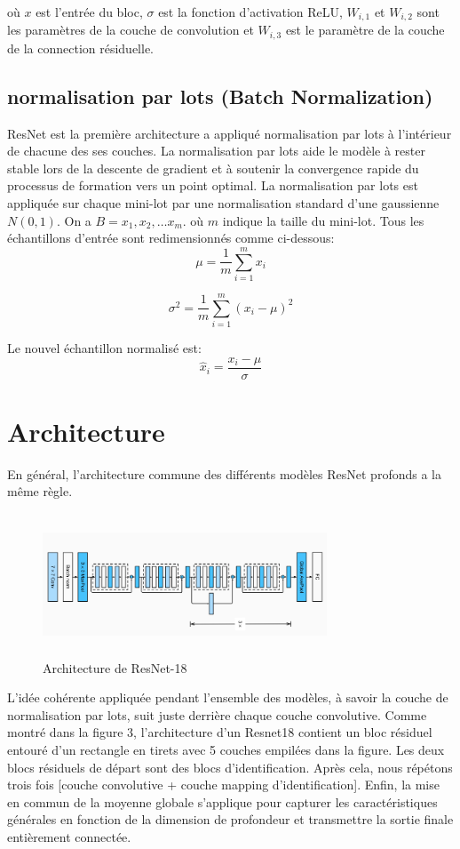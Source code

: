 \documentclass{article}
\begin{document}
où $x$ est l'entrée du bloc, $\sigma$ est la fonction d'activation ReLU, $W_{i,1}$ et $W_{i,2}$ sont les paramètres de la
couche de convolution et $W_{i,3}$ est le paramètre de la couche de la connection résiduelle.


\subsection{normalisation par lots (Batch Normalization)}
ResNet est la première architecture a appliqué normalisation par lots à l'intérieur de chacune des ses couches. La normalisation par lots aide le
modèle à rester stable lors de la descente de gradient et à soutenir la convergence rapide du processus de formation vers
un point optimal.
La normalisation par lots est appliquée sur chaque mini-lot par une normalisation standard d'une gaussienne $N(0,1)$.
On a $B=x_1,x_2,\dots x_m$.
où $m$ indique la taille du mini-lot. Tous les échantillons d'entrée sont redimensionnés comme ci-dessous:
\begin{equation}
    \mu = \frac{1}{m}\sum_{i=1}^{m}x_{i}
\end{equation}

\begin{equation}
    \sigma^{2} = \frac{1}{m}\sum_{i=1}^{m}(x_{i} - \mu)^{2}
\end{equation}

Le nouvel échantillon normalisé est:
\begin{equation}
    \hat{x}_{i} = \frac{x_{i} - \mu}{\sigma}
\end{equation}

\section{Architecture}
En général, l'architecture commune des différents modèles ResNet profonds a la même règle.
\begin{figure}[h]
    \centering
    \includegraphics[width=240pt,height=120pt]{./img/model}
    \caption{Architecture de ResNet-18}\label{fig: model}
\end{figure}
L'idée cohérente appliquée pendant l'ensemble des modèles, à savoir la couche de normalisation par lots, suit juste
derrière chaque couche convolutive.
Comme montré dans la figure 3, l'architecture d'un Resnet18 contient un bloc résiduel entouré d'un rectangle en tirets
avec 5 couches empilées dans la figure. Les deux blocs résiduels de départ sont des blocs d'identification. Après cela,
nous répétons trois fois [couche convolutive + couche mapping d'identification]. Enfin, la mise en commun de la moyenne
globale s'applique pour capturer les caractéristiques générales en fonction de la dimension de profondeur et transmettre
la sortie finale entièrement connectée.
\end{document}
